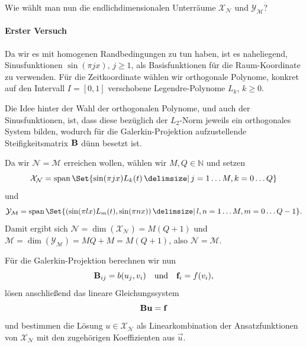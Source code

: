 Wie wählt man nun die endlichdimensionalen Unterräume $\mathcal X_{\mathcal N}$ und $\mathcal Y_{\mathcal M}$?

\paragraph{Erster Versuch} %
\label{par:erster_versuch}

Da wir es mit homogenen Randbedingungen zu tun haben, ist es naheliegend, Sinusfunktionen $\sin(\pi j x)$, $j \geq 1$, als Basisfunktionen für die Raum-Koordinate zu verwenden.
Für die Zeitkoordinate wählen wir orthogonale Polynome, konkret auf den Intervall $I = [0, 1]$ verschobene Legendre-Polynome $L_{k}$, $k \geq 0$.

Die Idee hinter der Wahl der orthogonalen Polynome, und auch der Sinusfunktionen, ist, dass diese bezüglich der $L_{2}$-Norm jeweils ein orthogonales System bilden, wodurch für die Galerkin-Projektion aufzustellende Steifigkeitsmatrix $\mathbf{B}$ dünn besetzt ist.

Da wir $\mathcal N = \mathcal M$ erreichen wollen, wählen wir $M, Q \in \mathbb{N}$ und setzen
\begin{equation}
    \mathcal X_{\mathcal N} = \spn\Set{ \sin(\pi j x) L_{k}(t) \given j = 1 \dots M, k = 0 \dots Q }
\end{equation}
und
\begin{equation}
    \mathcal Y_{\mathcal M} = \spn\Set{ (\sin(\pi l x) L_{m}(t), \sin(\pi n x)) \given l, n = 1 \dots M, m = 0 \dots Q - 1 }.
\end{equation}
Damit ergibt sich $\mathcal N = \dim(\mathcal X_{\mathcal N}) = M (Q + 1)$ und $\mathcal M = \dim(\mathcal Y_{\mathcal M}) = M Q + M = M ( Q + 1 )$, also $\mathcal N = \mathcal M$.

Für die Galerkin-Projektion berechnen wir nun
\begin{equation}
    \mathbf{B}_{ij} = b(u_{j}, v_{i}) \quad\text{und}\quad \mathbf{f}_{i} = f(v_{i}),
\end{equation}
lösen anschließend das lineare Gleichungssystem
\begin{equation}
    \mathbf{B} \mathbf{u} = \mathbf{f}
\end{equation}
und bestimmen die Lösung $u \in \mathcal X_{\mathcal N}$ als Linearkombination der Ansatzfunktionen von $\mathcal X_{\mathcal N}$ mit den zugehörigen Koeffizienten aus $\vec u$.

